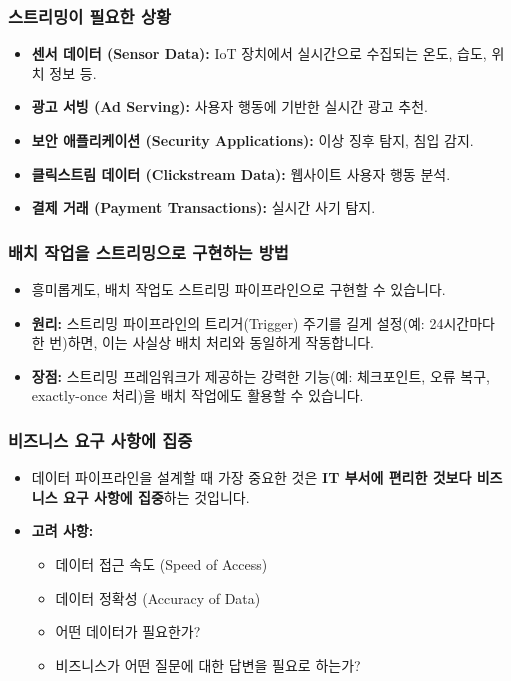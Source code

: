 \documentclass[11pt,a4paper]{article}
\begin{document}
\subsubsection{스트리밍이 필요한 상황}
\begin{itemize}
    \item \textbf{센서 데이터 (Sensor Data):} IoT 장치에서 실시간으로 수집되는 온도, 습도, 위치 정보 등.
    \item \textbf{광고 서빙 (Ad Serving):} 사용자 행동에 기반한 실시간 광고 추천.
    \item \textbf{보안 애플리케이션 (Security Applications):} 이상 징후 탐지, 침입 감지.
    \item \textbf{클릭스트림 데이터 (Clickstream Data):} 웹사이트 사용자 행동 분석.
    \item \textbf{결제 거래 (Payment Transactions):} 실시간 사기 탐지.
\end{itemize}

\subsubsection{배치 작업을 스트리밍으로 구현하는 방법}
\begin{itemize}
    \item 흥미롭게도, 배치 작업도 스트리밍 파이프라인으로 구현할 수 있습니다.
    \item \textbf{원리:} 스트리밍 파이프라인의 트리거(Trigger) 주기를 길게 설정(예: 24시간마다 한 번)하면, 이는 사실상 배치 처리와 동일하게 작동합니다.
    \item \textbf{장점:} 스트리밍 프레임워크가 제공하는 강력한 기능(예: 체크포인트, 오류 복구, exactly-once 처리)을 배치 작업에도 활용할 수 있습니다.
\end{itemize}

\subsubsection{비즈니스 요구 사항에 집중}
\begin{itemize}
    \item 데이터 파이프라인을 설계할 때 가장 중요한 것은 \textbf{IT 부서에 편리한 것보다 비즈니스 요구 사항에 집중}하는 것입니다.
    \item \textbf{고려 사항:}
    \begin{itemize}
        \item 데이터 접근 속도 (Speed of Access)
        \item 데이터 정확성 (Accuracy of Data)
        \item 어떤 데이터가 필요한가?
        \item 비즈니스가 어떤 질문에 대한 답변을 필요로 하는가?
    \end{itemize}
\end{itemize}
\end{document}

